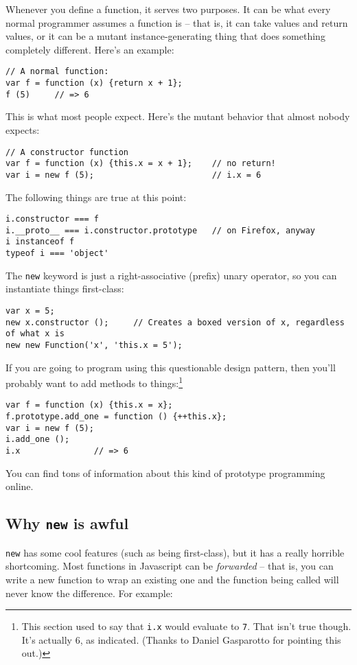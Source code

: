 \documentclass{article}
\begin{document}
  Whenever you define a function, it serves two purposes. It can be what every normal programmer assumes a function is -- that is, it can take values and return values, or it can be a
  mutant instance-generating thing that does something completely different. Here's an example:

\begin{verbatim}
// A normal function:
var f = function (x) {return x + 1};
f (5)     // => 6
\end{verbatim}

  This is what most people expect. Here's the mutant behavior that almost nobody expects:

\begin{verbatim}
// A constructor function
var f = function (x) {this.x = x + 1};    // no return!
var i = new f (5);                        // i.x = 6
\end{verbatim}

  The following things are true at this point:

\begin{verbatim}
i.constructor === f
i.__proto__ === i.constructor.prototype   // on Firefox, anyway
i instanceof f
typeof i === 'object'
\end{verbatim}

  The \verb|new| keyword is just a right-associative (prefix) unary operator, so you can instantiate things first-class:

\begin{verbatim}
var x = 5;
new x.constructor ();     // Creates a boxed version of x, regardless of what x is
new new Function('x', 'this.x = 5');
\end{verbatim}

  If you are going to program using this questionable design pattern, then you'll probably want to add methods to things:\footnote{This section used to say that {\tt i.x} would evaluate to
  {\tt 7}. That isn't true though. It's actually 6, as indicated. (Thanks to Daniel Gasparotto for pointing this out.)}

\begin{verbatim}
var f = function (x) {this.x = x};
f.prototype.add_one = function () {++this.x};
var i = new f (5);
i.add_one ();
i.x               // => 6
\end{verbatim}

  You can find tons of information about this kind of prototype programming online.

\subsection {Why {\tt new} is awful}
    {\tt new} has some cool features (such as being first-class), but it has a really horrible shortcoming. Most functions in Javascript can be {\it forwarded} -- that is, you can write a new
    function to wrap an existing one and the function being called will never know the difference. For example:
\end{document}
